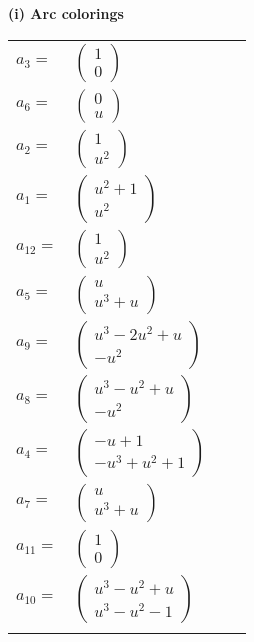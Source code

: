 \documentclass[1p]{elsarticle_modified}
\theoremstyle{definition}
\begin{document}
\flushleft \textbf{(i) Arc colorings}\\
\begin{tabular}{m{7pt} m{180pt} m{7pt} m{180pt} }
\flushright $a_{3}=$&$\begin{pmatrix}1\\0\end{pmatrix}$ \\
\flushright $a_{6}=$&$\begin{pmatrix}0\\u\end{pmatrix}$ \\
\flushright $a_{2}=$&$\begin{pmatrix}1\\u^2\end{pmatrix}$ \\
\flushright $a_{1}=$&$\begin{pmatrix}u^2+1\\u^2\end{pmatrix}$ \\
\flushright $a_{12}=$&$\begin{pmatrix}1\\u^2\end{pmatrix}$ \\
\flushright $a_{5}=$&$\begin{pmatrix}u\\u^3+u\end{pmatrix}$ \\
\flushright $a_{9}=$&$\begin{pmatrix}u^3-2 u^2+u\\- u^2\end{pmatrix}$ \\
\flushright $a_{8}=$&$\begin{pmatrix}u^3- u^2+u\\- u^2\end{pmatrix}$ \\
\flushright $a_{4}=$&$\begin{pmatrix}- u+1\\- u^3+u^2+1\end{pmatrix}$ \\
\flushright $a_{7}=$&$\begin{pmatrix}u\\u^3+u\end{pmatrix}$ \\
\flushright $a_{11}=$&$\begin{pmatrix}1\\0\end{pmatrix}$ \\
\flushright $a_{10}=$&$\begin{pmatrix}u^3- u^2+u\\u^3- u^2-1\end{pmatrix}$\\&\end{tabular}
\end{document}
